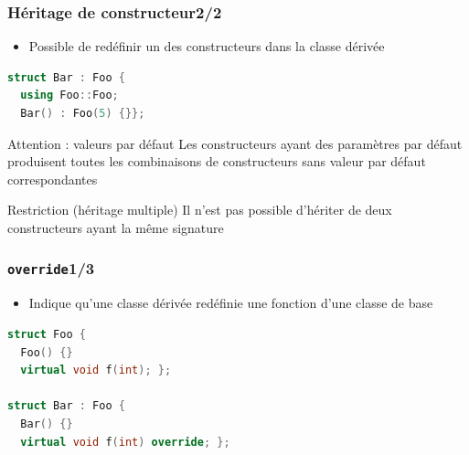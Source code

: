 \documentclass[C++.tex]{subfiles}
\begin{document}
\begin{frame}[fragile]
	\frametitle{Héritage de constructeur\titlehfill{}2/2}
	\begin{itemize}
		\item Possible de redéfinir un des constructeurs dans la classe dérivée
	\end{itemize}

	\begin{lstlisting}[language=C++]
struct Bar : Foo {
  using Foo::Foo;
  Bar() : Foo(5) {}};\end{lstlisting}

	\begin{alertblock}{Attention : valeurs par défaut}
		Les constructeurs ayant des paramètres par défaut produisent toutes les combinaisons de constructeurs sans valeur par défaut correspondantes

	\end{alertblock}

	\begin{alertblock}{Restriction (héritage multiple)}
		Il n'est pas possible d'hériter de deux constructeurs ayant la même signature
	\end{alertblock}

\end{frame}

\begin{frame}[fragile]
	\frametitle{\lstinline|override|\titlehfill{}1/3}
	\begin{itemize}
		\item Indique qu'une classe dérivée redéfinie une fonction d'une classe de base
	\end{itemize}

	\begin{lstlisting}[language=C++]
struct Foo {
  Foo() {}
  virtual void f(int); };

struct Bar : Foo {
  Bar() {}
  virtual void f(int) override; };
\end{lstlisting}
\end{frame}
\end{document}
